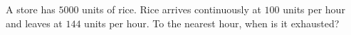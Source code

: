 A store has $5000$ units of rice. Rice arrives continuously at $100$ units per hour and leaves at $144$ units per hour. To the nearest hour, when is it exhausted?
